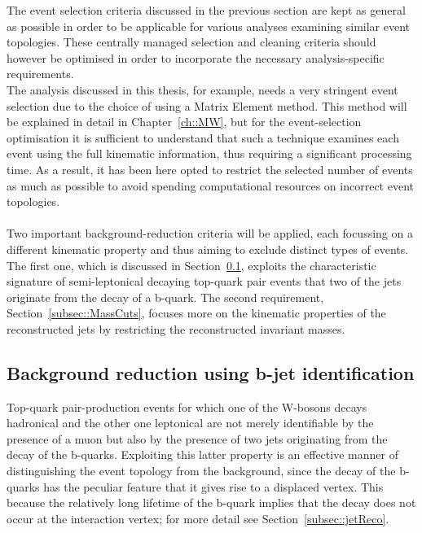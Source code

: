 The event selection criteria discussed in the previous section are kept as general as possible in order to be applicable for various analyses examining similar event topologies.
These centrally managed selection and cleaning criteria should however be optimised in order to incorporate the necessary analysis-specific requirements.
\\
The analysis discussed in this thesis, for example, needs a very stringent event selection due to the choice of using a Matrix Element method.
This method will be explained in detail in Chapter~\ref{ch::MW}, but for the event-selection optimisation it is sufficient to understand that such a technique examines each event using the full kinematic information, thus requiring a significant processing time. As a result, it has been here opted to restrict the selected number of events as much as possible to avoid spending computational resources on incorrect event topologies.
\\
\\
Two important background-reduction criteria will be applied, each focussing on a different kinematic property and thus aiming to exclude distinct types of events. 
The first one, which is discussed in Section~\ref{subsec::BTag}, exploits the characteristic signature of semi-leptonical decaying top-quark pair events that two of the jets originate from the decay of a b-quark. The second requirement, Section~\ref{subsec::MassCuts}, focuses more on the kinematic properties of the reconstructed jets by restricting the reconstructed invariant masses.

\subsection{Background reduction using b-jet identification}\label{subsec::BTag}

Top-quark pair-production events for which one of the W-bosons decays hadronical and the other one leptonical are not merely identifiable by the presence of a muon but also by the presence of two jets originating from the decay of the b-quarks.
Exploiting this latter property is an effective manner of distinguishing the event topology from the background, since the decay of the b-quarks has the peculiar feature that it gives rise to a displaced vertex. This because the relatively long lifetime of the b-quark implies that the decay does not occur at the interaction vertex; for more detail see Section~\ref{subsec::jetReco}.
\\ 

